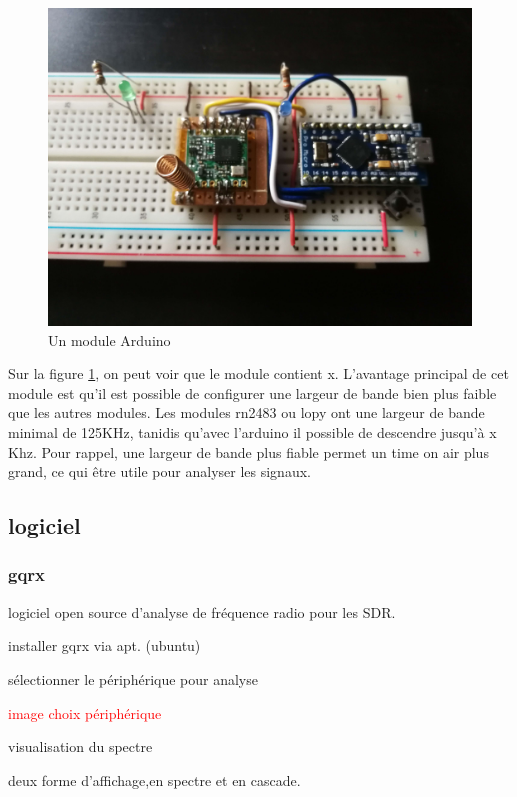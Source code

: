 \begin{figure}[h]
\centering

\includegraphics[scale=0.08]{images/arduino.png}
\caption{Un module Arduino}\label{term36}
\end{figure}

Sur la figure \ref{term36}, on peut voir que le module contient x. L'avantage principal de cet module est qu'il est possible de configurer une largeur de bande bien plus faible que les autres modules. Les modules rn2483 ou lopy ont une largeur de bande minimal de 125KHz, tanidis qu'avec l'arduino il possible de descendre jusqu'à x Khz. Pour rappel, une largeur de bande plus fiable permet un time on air plus grand, ce qui être utile pour analyser les signaux. 

\subsection{logiciel}

\subsubsection{gqrx}

logiciel open source d'analyse de fréquence radio pour les SDR.

installer gqrx via apt. (ubuntu)

sélectionner le périphérique pour analyse

\textcolor{red}{image choix périphérique}

visualisation du spectre

deux forme d'affichage,en spectre et en cascade.

